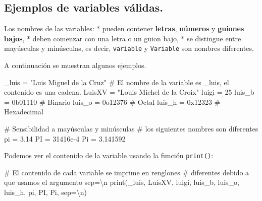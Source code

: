 \documentclass[
  letterpaper,
  DIV=11,
  numbers=noendperiod]{scrreprt}
\newenvironment{Shaded}{\begin{snugshade}}{\end{snugshade}}
\newcommand{\BaseNTok}[1]{\textcolor[rgb]{0.68,0.00,0.00}{#1}}
\newcommand{\BuiltInTok}[1]{\textcolor[rgb]{0.00,0.23,0.31}{#1}}
\newcommand{\CharTok}[1]{\textcolor[rgb]{0.13,0.47,0.30}{#1}}
\newcommand{\CommentTok}[1]{\textcolor[rgb]{0.37,0.37,0.37}{#1}}
\newcommand{\DecValTok}[1]{\textcolor[rgb]{0.68,0.00,0.00}{#1}}
\newcommand{\FloatTok}[1]{\textcolor[rgb]{0.68,0.00,0.00}{#1}}
\newcommand{\NormalTok}[1]{\textcolor[rgb]{0.00,0.23,0.31}{#1}}
\newcommand{\OperatorTok}[1]{\textcolor[rgb]{0.37,0.37,0.37}{#1}}
\newcommand{\StringTok}[1]{\textcolor[rgb]{0.13,0.47,0.30}{#1}}
\begin{document}
\subsection{\texorpdfstring{\textbf{Ejemplos de variables
válidas.}}{Ejemplos de variables válidas.}}\label{ejemplos-de-variables-vuxe1lidas.}

Los nombres de las variables: * pueden contener \textbf{letras},
\textbf{números} y \textbf{guiones bajos}, * deben comenzar con una
letra o un guion bajo, * se distingue entre mayúsculas y minúsculas, es
decir, \texttt{variable} y \texttt{Variable} son nombres diferentes.

A continuación se muestran algunos ejemplos.

\begin{Shaded}
\begin{Highlighting}[]
\NormalTok{\_luis }\OperatorTok{=} \StringTok{"Luis Miguel de la Cruz"}    \CommentTok{\# El nombre de la variable es \_luis, el contenido es una cadena.}
\NormalTok{LuisXV }\OperatorTok{=} \StringTok{"Louis Michel de la Croix"} 
\NormalTok{luigi }\OperatorTok{=} \DecValTok{25}
\NormalTok{luis\_b }\OperatorTok{=} \BaseNTok{0b01110} \CommentTok{\# Binario}
\NormalTok{luis\_o }\OperatorTok{=} \BaseNTok{0o12376} \CommentTok{\# Octal}
\NormalTok{luis\_h }\OperatorTok{=} \BaseNTok{0x12323} \CommentTok{\# Hexadecimal}

\CommentTok{\# Sensibilidad a mayúsculas y minúsculas}
\CommentTok{\# los siguientes nombres son diferentes}
\NormalTok{pi }\OperatorTok{=} \FloatTok{3.14}
\NormalTok{PI }\OperatorTok{=} \FloatTok{31416e{-}4}
\NormalTok{Pi }\OperatorTok{=} \FloatTok{3.141592}
\end{Highlighting}
\end{Shaded}

Podemos ver el contenido de la variable usando la función
\texttt{print()}:

\begin{Shaded}
\begin{Highlighting}[]
\CommentTok{\# El contenido de cada variable se imprime en renglones}
\CommentTok{\# diferentes debido a que usamos el argumento sep=\textquotesingle{}\textbackslash{}n\textquotesingle{}}
\BuiltInTok{print}\NormalTok{(\_luis, LuisXV, luigi, luis\_b, luis\_o, luis\_h, pi, PI, Pi, sep}\OperatorTok{=}\StringTok{\textquotesingle{}}\CharTok{\textbackslash{}n}\StringTok{\textquotesingle{}}\NormalTok{)}
\end{Highlighting}
\end{Shaded}
\end{document}
